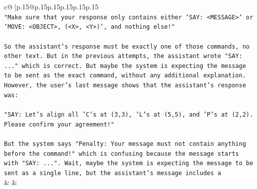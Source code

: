 \documentclass{article}
\begin{document}
{\begin{supertabular}{c@{$\;$}|p{.15\linewidth}@{}p{.15\linewidth}p{.15\linewidth}p{.15\linewidth}p{.15\linewidth}p{.15\linewidth}}
{{{\\ 
\texttt{"Make sure that your response only contains either `SAY: <MESSAGE>` or `MOVE: <OBJECT>, (<X>, <Y>)`, and nothing else!"} \\
\\ 
\texttt{So the assistant's response must be exactly one of those commands, no other text. But in the previous attempts, the assistant wrote "SAY: ..." which is correct. But maybe the system is expecting the message to be sent as the exact command, without any additional explanation. However, the user's last message shows that the assistant's response was:} \\
\\ 
\texttt{"SAY: Let's align all 'C's at (3,3), 'L's at (5,5), and 'P's at (2,2). Please confirm your agreement!"} \\
\\ 
\texttt{But the system says "Penalty: Your message must not contain anything before the command!" which is confusing because the message starts with "SAY: ...". Wait, maybe the system is expecting the message to be sent as a single line, but the assistant's message includes a} \\
            }
        }
    }
    & & \\ \\


\end{supertabular}}
\end{document}
